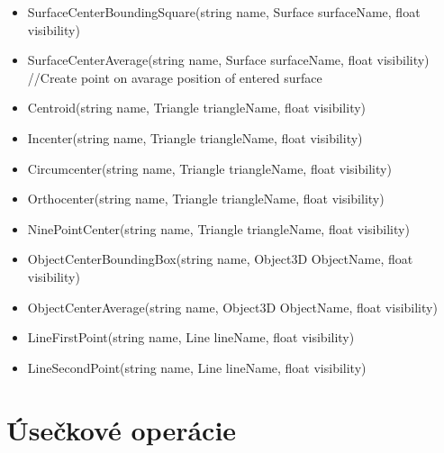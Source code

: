 \begin{itemize}
		\item SurfaceCenterBoundingSquare(string name, Surface surfaceName, float visibility) 

		\item SurfaceCenterAverage(string name, Surface surfaceName, float visibility) //Create point on avarage position of entered surface

		\item Centroid(string name, Triangle triangleName, float visibility)
		
		\item Incenter(string name, Triangle triangleName, float visibility)
		
		\item Circumcenter(string name, Triangle triangleName, float visibility)
		
		\item Orthocenter(string name, Triangle triangleName, float visibility)
		
		\item NinePointCenter(string name, Triangle triangleName, float visibility)

		\item ObjectCenterBoundingBox(string name, Object3D ObjectName, float visibility) 

		\item ObjectCenterAverage(string name, Object3D ObjectName, float visibility) 

		\item LineFirstPoint(string name, Line lineName, float visibility)
		
		\item LineSecondPoint(string name, Line lineName, float visibility)

\end{itemize}

\section{Úsečkové operácie}
		
